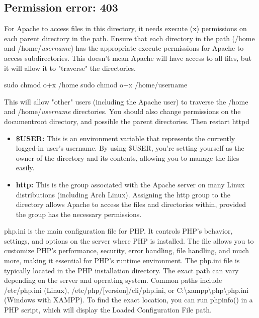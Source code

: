 \documentclass{report}
\begin{document}
    \bigbreak \noindent 
    \subsection{Permission error: 403}
    \bigbreak \noindent 
    For Apache to access files in this directory, it needs execute (x) permissions on each parent directory in the path.
    \bigbreak \noindent 
    Ensure that each directory in the path (/home and /home/\textit{username}) has the appropriate execute permissions for Apache to access subdirectories. This doesn't mean Apache will have access to all files, but it will allow it to "traverse" the directories.
    \bigbreak \noindent 
    \begin{bashcode}
        sudo chmod o+x /home
        sudo chmod o+x /home/username
    \end{bashcode}
    \bigbreak \noindent 
    This will allow "other" users (including the Apache user) to traverse the /home and /home/\textit{username} directories.
    \bigbreak \noindent 
    You should also change permissions on the documentroot directory, and possible the parent directories. Then restart httpd
    \bigbreak \noindent 
    \begin{itemize}
        \item \textbf{\$USER:} This is an environment variable that represents the currently logged-in user's username. By using \$USER, you’re setting yourself as the owner of the directory and its contents, allowing you to manage the files easily.
        \item \textbf{http:} This is the group associated with the Apache server on many Linux distributions (including Arch Linux). Assigning the http group to the directory allows Apache to access the files and directories within, provided the group has the necessary permissions.
    \end{itemize}

    \pagebreak 
    \bigbreak \noindent 
    php.ini is the main configuration file for PHP. It controls PHP's behavior, settings, and options on the server where PHP is installed. The file allows you to customize PHP's performance, security, error handling, file handling, and much more, making it essential for PHP's runtime environment.
    \bigbreak \noindent 
    The php.ini file is typically located in the PHP installation directory.
    \bigbreak \noindent 
    The exact path can vary depending on the server and operating system. Common paths include /etc/php.ini (Linux), /etc/php/[version]/cli/php.ini, or C:\textbackslash xampp\textbackslash php\textbackslash php.ini (Windows with XAMPP).
    \bigbreak \noindent 
    To find the exact location, you can run phpinfo() in a PHP script, which will display the Loaded Configuration File path.
    \bigbreak \noindent 
\end{document}
